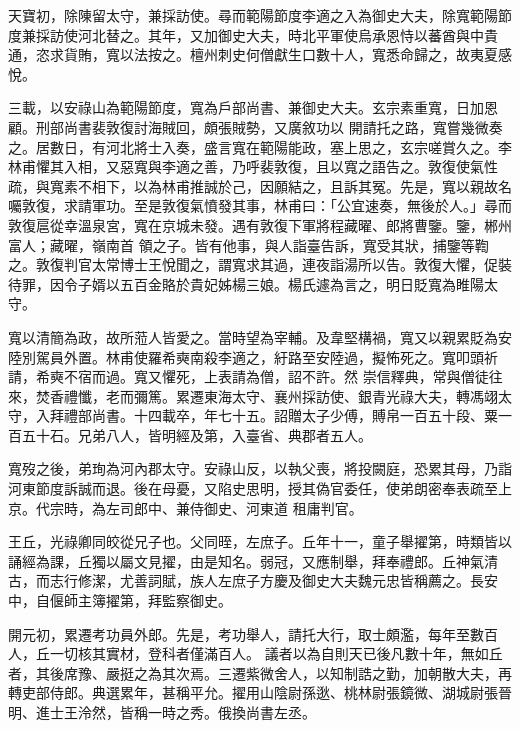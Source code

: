 \begin{pinyinscope}
 天寶初，除陳留太守，兼採訪使。尋而範陽節度李適之入為御史大夫，除寬範陽節度兼採訪使河北替之。其年，又加御史大夫，時北平軍使烏承恩恃以蕃酋與中貴通，恣求貨賄，寬以法按之。檀州刺史何僧獻生口數十人，寬悉命歸之，故夷夏感悅。



 三載，以安祿山為範陽節度，寬為戶部尚書、兼御史大夫。玄宗素重寬，日加恩顧。刑部尚書裴敦復討海賊回，頗張賊勢，又廣敘功以
 開請托之路，寬嘗幾微奏之。居數日，有河北將士入奏，盛言寬在範陽能政，塞上思之，玄宗嗟賞久之。李林甫懼其入相，又惡寬與李適之善，乃呼裴敦復，且以寬之語告之。敦復使氣性疏，與寬素不相下，以為林甫推誠於己，因願結之，且訴其冤。先是，寬以親故名囑敦復，求請軍功。至是敦復氣憤發其事，林甫曰：「公宜速奏，無後於人。」尋而敦復扈從幸溫泉宮，寬在京城未發。遇有敦復下軍將程藏曜、郎將曹鑒。鑒，郴州富人；藏曜，嶺南首
 領之子。皆有他事，與人詣臺告訴，寬受其狀，捕鑒等鞫之。敦復判官太常博士王悅聞之，謂寬求其過，連夜詣湯所以告。敦復大懼，促裝待罪，因令子婿以五百金賂於貴妃姊楊三娘。楊氏遽為言之，明日貶寬為睢陽太守。



 寬以清簡為政，故所蒞人皆愛之。當時望為宰輔。及韋堅構禍，寬又以親累貶為安陸別駕員外置。林甫使羅希奭南殺李適之，紆路至安陸過，擬怖死之。寬叩頭祈請，希奭不宿而過。寬又懼死，上表請為僧，詔不許。然
 崇信釋典，常與僧徒往來，焚香禮懺，老而彌篤。累遷東海太守、襄州採訪使、銀青光祿大夫，轉馮翊太守，入拜禮部尚書。十四載卒，年七十五。詔贈太子少傅，賻帛一百五十段、粟一百五十石。兄弟八人，皆明經及第，入臺省、典郡者五人。



 寬歿之後，弟珣為河內郡太守。安祿山反，以執父喪，將投闕庭，恐累其母，乃詣河東節度訴誠而退。後在母憂，又陷史思明，授其偽官委任，使弟朗密奉表疏至上京。代宗時，為左司郎中、兼侍御史、河東道
 租庸判官。



 王丘，光祿卿同皎從兄子也。父同晊，左庶子。丘年十一，童子舉擢第，時類皆以誦經為課，丘獨以屬文見擢，由是知名。弱冠，又應制舉，拜奉禮郎。丘神氣清古，而志行修潔，尤善詞賦，族人左庶子方慶及御史大夫魏元忠皆稱薦之。長安中，自偃師主簿擢第，拜監察御史。



 開元初，累遷考功員外郎。先是，考功舉人，請托大行，取士頗濫，每年至數百人，丘一切核其實材，登科者僅滿百人。
 議者以為自則天已後凡數十年，無如丘者，其後席豫、嚴挺之為其次焉。三遷紫微舍人，以知制誥之勤，加朝散大夫，再轉吏部侍郎。典選累年，甚稱平允。擢用山陰尉孫逖、桃林尉張鏡微、湖城尉張晉明、進士王泠然，皆稱一時之秀。俄換尚書左丞。




\end{pinyinscope}
